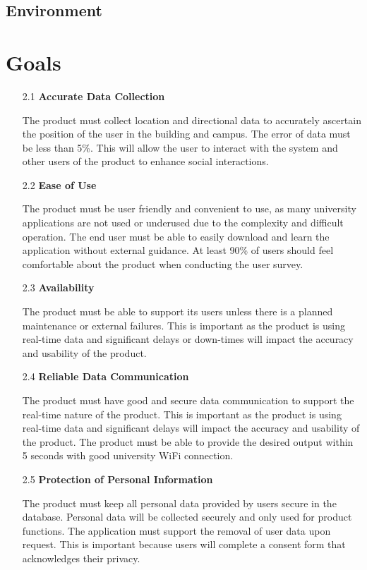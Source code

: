 \documentclass{article}
\begin{document}
\subsection{Environment}


\section{Goals}
\begin{itemize}
\item[2.1] \textbf{Accurate Data Collection}

The product must collect location and directional data to accurately ascertain the position of the user in the building and campus. The error of data must be less than 5\%. This will allow the user to interact with the system and other users of the product to enhance social interactions. 

\item[2.2] \textbf{Ease of Use}

The product must be user friendly and convenient to use, as many university applications are not used or underused due to the complexity and difficult operation. The end user must be able to easily download and learn the application without external guidance. At least 90\% of users should feel comfortable about the product when conducting the user survey.

\item[2.3] \textbf{Availability}

The product must be able to support its users unless there is a planned maintenance or external failures. This is important as the product is using real-time data and significant delays or down-times will impact the accuracy and usability of the product.

\item[2.4] \textbf{Reliable Data Communication}

The product must have good and secure data communication to support the real-time nature of the product. This is important as the product is using real-time data and significant delays will impact the accuracy and usability of the product. The product must be able to provide the desired output within 5 seconds with good university WiFi connection.

\item[2.5] \textbf{Protection of Personal Information}

The product must keep all personal data provided by users secure in the database. Personal data will be collected securely and only used for product functions. The application must support the removal of user data upon request. This is important because users will complete a consent form that acknowledges their privacy.


\end{itemize}
\end{document}
